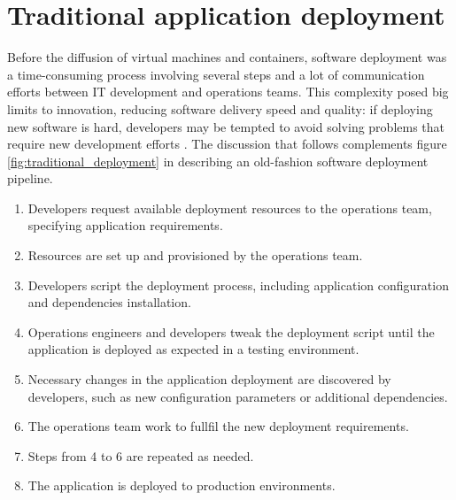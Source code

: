 \section{Traditional application deployment}
Before the diffusion of virtual machines and containers, software deployment was a time-consuming process involving several steps and a lot of communication efforts between IT development and operations teams. 
This complexity posed big limits to innovation, reducing software delivery speed and quality: if deploying new software is hard, developers may be tempted to avoid solving problems that require new development efforts \cite{kaneDockerRunningShipping2023}.
The discussion that follows complements figure \ref{fig:traditional_deployment} in describing an old-fashion software deployment pipeline.
\begin{enumerate}
    \item Developers request available deployment resources to the operations team, specifying application requirements.
    \item Resources are set up and provisioned by the operations team.
    \item Developers script the deployment process, including application configuration and dependencies installation.
    \item Operations engineers and developers tweak the deployment script until the application is deployed as expected in a testing environment.
    \item Necessary changes in the application deployment are discovered by developers, such as new configuration parameters or additional dependencies. 
    \item The operations team work to fullfil the new deployment requirements.
    \item Steps from 4 to 6 are repeated as needed.
    \item The application is deployed to production environments.
\end{enumerate}

